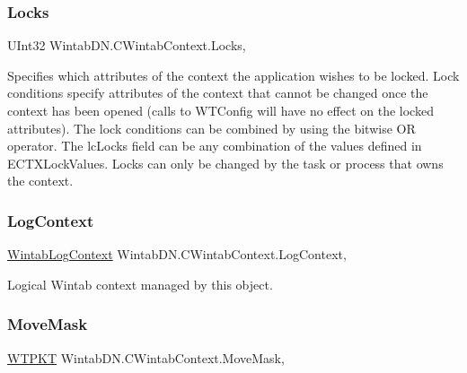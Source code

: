 \subsubsection{\texorpdfstring{Locks}{Locks}}
{\footnotesize\ttfamily U\+Int32 Wintab\+D\+N.\+C\+Wintab\+Context.\+Locks\hspace{0.3cm}{\ttfamily [get]}, {\ttfamily [set]}}



Specifies which attributes of the context the application wishes to be locked. Lock conditions specify attributes of the context that cannot be changed once the context has been opened (calls to W\+T\+Config will have no effect on the locked attributes). The lock conditions can be combined by using the bitwise OR operator. The lc\+Locks field can be any combination of the values defined in E\+C\+T\+X\+Lock\+Values. Locks can only be changed by the task or process that owns the context. 

\mbox{\label{class_wintab_d_n_1_1_c_wintab_context_ad1aaf328b7c7aeb2b98e8c4e167047b6}} 
\subsubsection{\texorpdfstring{Log\+Context}{LogContext}}
{\footnotesize\ttfamily \mbox{\hyperlink{struct_wintab_d_n_1_1_wintab_log_context}{Wintab\+Log\+Context}} Wintab\+D\+N.\+C\+Wintab\+Context.\+Log\+Context\hspace{0.3cm}{\ttfamily [get]}, {\ttfamily [set]}}



Logical Wintab context managed by this object. ~\newline


\mbox{\label{class_wintab_d_n_1_1_c_wintab_context_a76772f28304fd4f8e4c511e7b65bdd59}} 
\subsubsection{\texorpdfstring{Move\+Mask}{MoveMask}}
{\footnotesize\ttfamily \mbox{\hyperlink{class_wintab_d_n_1_1_w_t_p_k_t}{W\+T\+P\+KT}} Wintab\+D\+N.\+C\+Wintab\+Context.\+Move\+Mask\hspace{0.3cm}{\ttfamily [get]}, {\ttfamily [set]}}



